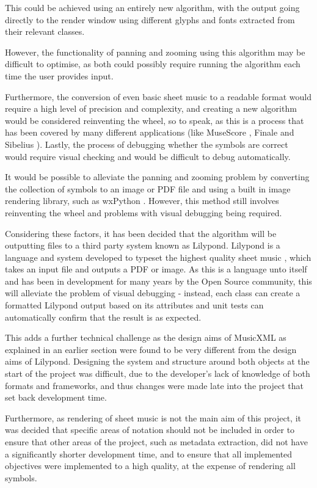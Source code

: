 This could be achieved using an entirely new algorithm, with the output going directly to the render window using different glyphs and fonts extracted from their relevant classes.

However, the functionality of panning and zooming using this algorithm may be difficult to optimise, as both could possibly require running the algorithm each time the user provides input. 

Furthermore, the conversion of even basic sheet music to a readable format would require a high level of precision and complexity, and creating a new algorithm would be considered reinventing the wheel, so to speak, as this is a process that has been covered by many different applications (like MuseScore \parencite{MuseTour}, Finale \parencite{mxml} and Sibelius \parencite{avid}). 
Lastly, the process of debugging whether the symbols are correct would require visual checking and would be difficult to debug automatically.

It would be possible to alleviate the panning and zooming problem by converting the collection of symbols to an image or PDF file and using a built in image rendering library, such as wxPython \parencite{WX}. However, this method still involves reinventing the wheel and problems with visual debugging being required.

Considering these factors, it has been decided that the algorithm will be outputting files to a third party system known as Lilypond. Lilypond is a language and system developed to typeset the highest quality sheet music \parencite{Lilypond}, which takes an input file and outputs a PDF or image. As this is a language unto itself and has been in development for many years by the Open Source community, this will alleviate the problem of visual debugging - instead, each class can create a formatted Lilypond output based on its attributes and unit tests can automatically confirm that the result is as expected.

This adds a further technical challenge as the design aims of MusicXML as explained in an earlier section were found to be very different from the design aims of Lilypond. Designing the system and structure around both objects at the start of the project was difficult, due to the developer's lack of knowledge of both formats and frameworks, and thus changes were made late into the project that set back development time.

Furthermore, as rendering of sheet music is not the main aim of this project, it was decided that specific areas of notation should not be included in order to ensure that other areas of the project, such as metadata extraction, did not have a significantly shorter development time, and to ensure that all implemented objectives were implemented to a high quality, at the expense of rendering all symbols.

